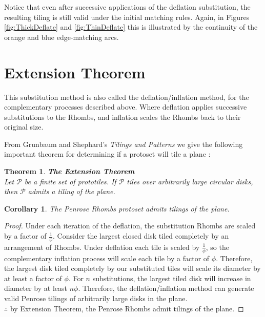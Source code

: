 \documentclass[
  oneside,
  11pt, a4paper,
  footinclude=true,
  headinclude=true,
  cleardoublepage=empty
]{scrbook}
\newtheorem{mythm}{Theorem}
\newtheorem{mycor}{Corollary}
\begin{document}
Notice that even after successive applications of the deflation substitution, the resulting tiling is still valid under the initial matching rules. Again, in Figures \ref{fig:ThickDeflate} and \ref{fig:ThinDeflate} this is illustrated by the continuity of the orange and blue edge-matching arcs.

\section{Extension Theorem}
This substitution method is also called the deflation/inflation method, for the complementary processes described above. Where deflation applies successive substitutions to the Rhombs, and inflation scales the Rhombs back to their original size.

From Grunbaum and Shephard's \textit{Tilings and Patterns} we give the following important theorem for determining if a protoset will tile a plane \cite{Grunbaum1986}:
\begin{mythm}
\textbf{The Extension Theorem\\}
Let $\mathcal{P}$ be a finite set of prototiles. If $\mathcal{P}$ tiles over arbitrarily large circular disks, then $\mathcal{P}$ admits a tiling of the plane. \cite{Grunbaum1986,Ross}
\end{mythm}

\begin{mycor}
The Penrose Rhombs protoset admits tilings of the plane.
\end{mycor}

\begin{proof}
Under each iteration of the deflation, the substitution Rhombs are scaled by a factor of $\frac{1}{\phi}$. Consider the largest closed disk tiled completely by an arrangement of Rhombs. Under deflation each tile is scaled by  $\frac{1}{\phi}$, so the complementary inflation process will scale each tile by a factor of $\phi$. Therefore, the largest disk tiled completely by our substituted tiles will scale its diameter by at least a factor of $\phi$. For $n$ substitutions, the largest tiled disk will increase in diameter by at least $n\phi$. Therefore, the deflation/inflation method can generate valid Penrose tilings of arbitrarily large disks in the plane.\\
$\therefore$ by Extension Theorem, the Penrose Rhombs admit tilings of the plane. 
\end{proof}
\end{document}

